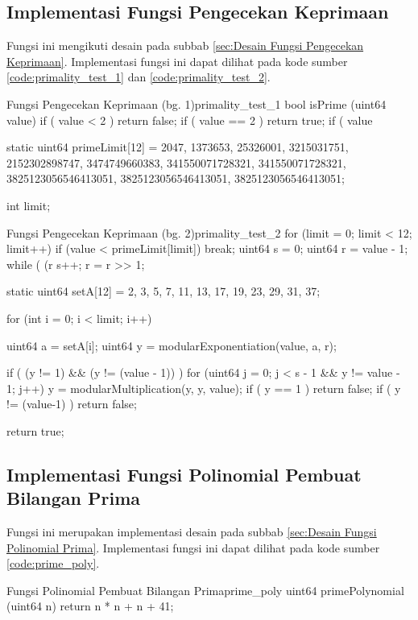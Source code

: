 \subsection{Implementasi Fungsi Pengecekan Keprimaan}

Fungsi ini mengikuti desain pada subbab \ref{sec:Desain Fungsi Pengecekan Keprimaan}. Implementasi fungsi ini dapat dilihat pada kode sumber \ref{code:primality_test_1} dan \ref{code:primality_test_2}.
\begin{code}[firstnumber=0]{Fungsi Pengecekan Keprimaan (bg. 1)}{primality_test_1}
bool isPrime (uint64 value)
if ( value < 2 ) return false;
if ( value == 2 ) return true;
if ( value %

static uint64 primeLimit[12] = {2047, 1373653, 25326001, 3215031751, 2152302898747, 3474749660383, 341550071728321, 341550071728321, 3825123056546413051, 3825123056546413051, 3825123056546413051};

int limit;
\end{code}
\pagebreak
\begin{code}[firstnumber=last, float=h!]{Fungsi Pengecekan Keprimaan (bg. 2)}{primality_test_2}
for (limit = 0; limit < 12; limit++)
	if (value < primeLimit[limit])
		break;
uint64 s = 0;
uint64 r = value - 1;
while ( (r %
{
	s++;
	r = r >> 1;
}

static uint64 setA[12] = {2, 3, 5, 7, 11, 13, 17, 19, 23, 29, 31, 37};

for (int i = 0; i < limit; i++)
{
	uint64 a = setA[i];
	uint64 y = modularExponentiation(value, a, r);
	
	if ( (y != 1) && (y != (value - 1)) )
	{
		for (uint64 j = 0; j < s - 1 && y != value - 1; j++)
		{			
			y = modularMultiplication(y, y, value);
			if ( y == 1 ) return false;
		}
		if ( y != (value-1) ) return false;
	}
}

return true;
\end{code}

\subsection{Implementasi Fungsi Polinomial Pembuat Bilangan Prima}

Fungsi ini merupakan implementasi desain pada subbab \ref{sec:Desain Fungsi Polinomial Prima}. Implementasi fungsi ini dapat dilihat pada kode sumber \ref{code:prime_poly}.
\begin{code}[firstnumber=0, float=h!]{Fungsi Polinomial Pembuat Bilangan Prima}{prime_poly}
uint64 primePolynomial (uint64 n)
return n * n + n + 41;
\end{code}


